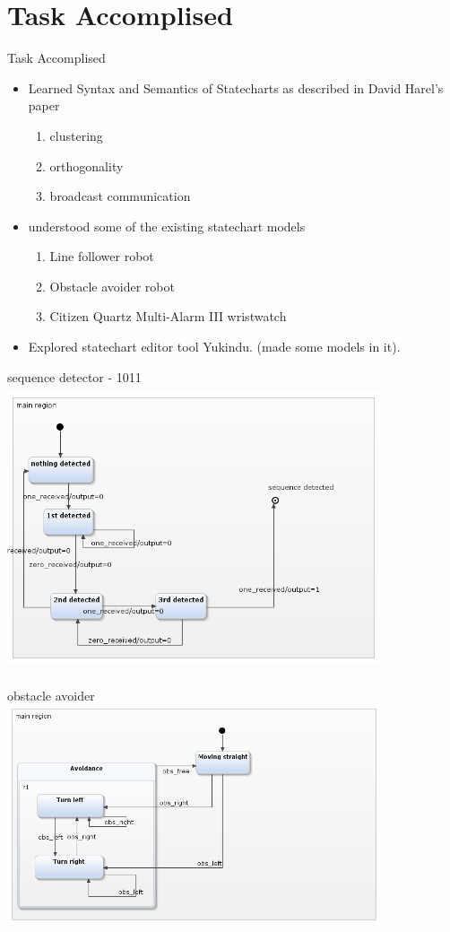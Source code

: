 \documentclass[10pt, a4paper]{beamer}
\begin{document}
\section{Task Accomplised}
\begin{frame}{Task Accomplised}
	\begin{itemize}
		\item Learned Syntax and Semantics of Statecharts as
		described in David Harel's paper
		\begin{enumerate}
			\item clustering
			\item orthogonality
			\item broadcast communication
		\end{enumerate}
		\item understood some of the existing statechart models
		\begin{enumerate}
			\item Line follower robot
			\item Obstacle avoider robot
			\item Citizen
			Quartz Multi-Alarm III wristwatch
		\end{enumerate}
	\item Explored statechart editor tool Yukindu. (made some models in it).
	\end{itemize}

\end{frame}
\begin{frame}{sequence detector - 1011}
\includegraphics[width=11cm, height=8.38cm]{sequence1011.png}
\end{frame}

\begin{frame}{obstacle avoider}
\includegraphics[width=11.04cm, height=6.5cm]{obstacle_avoider.png}
\end{frame}
\end{document}
